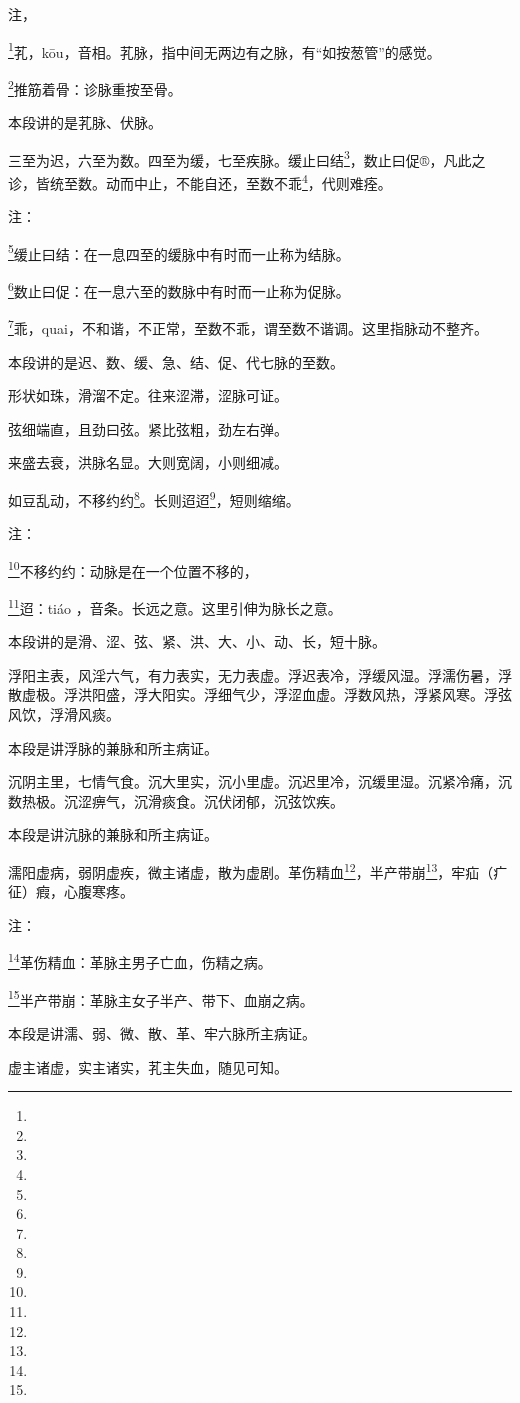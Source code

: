 \documentclass[a4paper,12pt,UTF8,twoside]{ctexbook}
\begin{document}
注，

\footnote{}芤，kōu，音相。芤脉，指中间无两边有之脉，有“如按葱管”的感觉。

\footnote{}推筋着骨：诊脉重按至骨。

本段讲的是芤脉、伏脉。

三至为迟，六至为数。四至为缓，七至疾脉。缓止曰结\footnote{}，数止曰促®，凡此之诊，皆统至数。动而中止，不能自还，至数不乖\footnote{}，代则难痊。

注：

\footnote{}缓止曰结：在一息四至的缓脉中有时而一止称为结脉。

\footnote{}数止曰促：在一息六至的数脉中有时而一止称为促脉。

\footnote{}乖，quai，不和谐，不正常，至数不乖，谓至数不谐调。这里指脉动不整齐。

本段讲的是迟、数、缓、急、结、促、代七脉的至数。

形状如珠，滑溜不定。往来涩滞，涩脉可证。

弦细端直，且劲曰弦。紧比弦粗，劲左右弹。

来盛去衰，洪脉名显。大则宽阔，小则细减。

如豆乱动，不移约约\footnote{}。长则迢迢\footnote{}，短则缩缩。

注：

\footnote{}不移约约：动脉是在一个位置不移的，

\footnote{}迢：tiáo ，音条。长远之意。这里引伸为脉长之意。

本段讲的是滑、涩、弦、紧、洪、大、小、动、长，短十脉。

浮阳主表，风淫六气，有力表实，无力表虚。浮迟表冷，浮缓风湿。浮濡伤暑，浮散虚极。浮洪阳盛，浮大阳实。浮细气少，浮涩血虚。浮数风热，浮紧风寒。浮弦风饮，浮滑风痰。

本段是讲浮脉的兼脉和所主病证。

沉阴主里，七情气食。沉大里实，沉小里虚。沉迟里冷，沉缓里湿。沉紧冷痛，沉数热极。沉涩痹气，沉滑痰食。沉伏闭郁，沉弦饮疾。

本段是讲沆脉的兼脉和所主病证。

濡阳虚病，弱阴虚疾，微主诸虚，散为虚剧。革伤精血\footnote{}，半产带崩\footnote{}，牢疝（疒征）瘕，心腹寒疼。

注：

\footnote{}革伤精血：革脉主男子亡血，伤精之病。

\footnote{}半产带崩：革脉主女子半产、带下、血崩之病。

本段是讲濡、弱、微、散、革、牢六脉所主病证。

虚主诸虚，实主诸实，芤主失血，随见可知。
\end{document}
